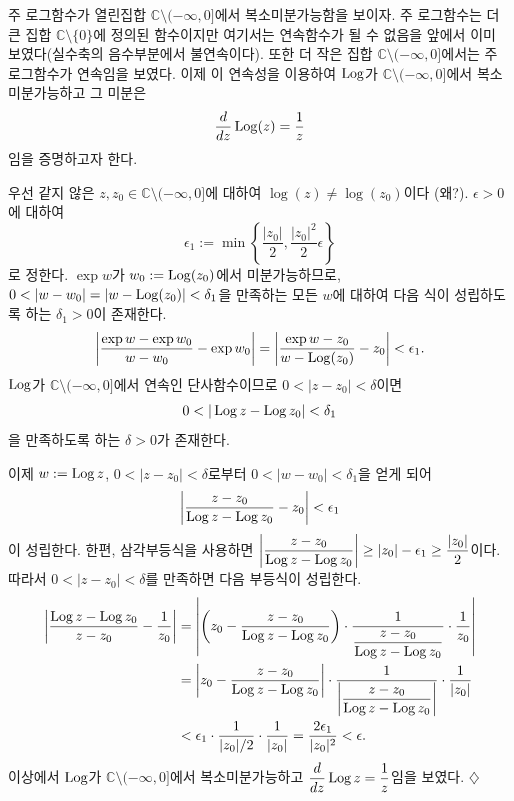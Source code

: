 \begin{salt_example} \label{example-2-9}
주 로그함수가 열린집합 $\mathbb C \setminus(-\infty,0]$에서
복소미분가능함을 보이자.
주 로그함수는 더 큰 집합 $\mathbb C \setminus\{0\}$에 정의된 함수이지만
여기서는 연속함수가 될 수 없음을 앞에서 이미 보였다(실수축의 음수부분에서 불연속이다).
또한 더 작은 집합 $\mathbb C \setminus(-\infty,0]$에서는 주 로그함수가 연속임을 보였다.
이제 이 연속성을 이용하여 $\mathop{\mathrm{Log}}$가 $\mathbb C \setminus(-\infty,0]$에서
복소미분가능하고 그 미분은
\[
\displaystyle\frac{d}{dz} \mathop{\mathrm{Log}} (z) = \displaystyle\frac 1z 
\]
임을 증명하고자 한다.

우선 같지 않은 $z, z_0 \in \mathbb C \setminus(-\infty,0]$에 대하여
$\log (z) \ne \log(z_0)$이다 (왜?).
$\epsilon>0$에 대하여
\[
\epsilon_1 := \min \left\{ \dfrac{|z_0|}2, \dfrac{|z_0|^2}2\epsilon \right\}
\]
로 정한다.
$\exp w$가 $w_0:=\mathop{\mathrm{Log}}(z_0)$에서 미분가능하므로,
$0<|w-w_0| = |w - \Log(z_0)| < \delta_1$을 만족하는 모든 $w$에 대하여
다음 식이 성립하도록 하는 $\delta_1>0$이 존재한다.
\[
\left| \displaystyle\frac{\exp w - \exp w_0}{w-w_0} - \exp w_0 \right|
= \left| \displaystyle\frac{\exp w - z_0}{w - \mathop{\mathrm{Log}}(z_0)} - z_0 \right| <\epsilon_1.
\]
$\mathop{\mathrm{Log}}$가 $\mathbb C \setminus(-\infty,0]$에서
연속인 단사함수이므로
$0<|z-z_0|<\delta$이면 
\[
0 < |\mathop{\mathrm{Log}} z - \mathop{\mathrm{Log}} z_0 | < \delta_1
\]
을 만족하도록 하는 $\delta>0$가 존재한다.

이제 $w:=\mathop{\mathrm{Log}} z$, $0<|z-z_0|<\delta$로부터
$0<|w-w_0|<\delta_1$을 얻게 되어
\[
\left| \displaystyle\frac{z-z_0}{\mathop{\mathrm{Log}} z - \mathop{\mathrm{Log}} z_0} - z_0 \right| < \epsilon_1
\]
이 성립한다.
한편, 삼각부등식을 사용하면
$ \left| \displaystyle\frac{z-z_0}{\mathop{\mathrm{Log}} z - \mathop{\mathrm{Log}} z_0} \right| \ge |z_0| - \epsilon_1 
\ge \displaystyle\frac{|z_0|}2$이다.
따라서 
$0<|z-z_0|<\delta$를 만족하면 다음 부등식이 성립한다.
\begin{align*}
\left| \displaystyle\frac{\mathop{\mathrm{Log}} z - \mathop{\mathrm{Log}} z_0}{z-z_0} - \displaystyle\frac1{z_0} \right|
&= \left| \left(z_0 - \displaystyle\frac{z-z_0}{\mathop{\mathrm{Log}} z - \mathop{\mathrm{Log}} z_0} \right)\cdot
\displaystyle\frac1{\displaystyle\frac{z-z_0}{\mathop{\mathrm{Log}} z - \mathop{\mathrm{Log}} z_0}}\cdot \displaystyle\frac1{z_0} \right| \\
&= \left| z_0 - \displaystyle\frac{z-z_0}{\mathop{\mathrm{Log}} z - \mathop{\mathrm{Log}} z_0} \right| \cdot
\displaystyle\frac1{\left|\displaystyle\frac{z-z_0}{\mathop{\mathrm{Log}} z - \mathop{\mathrm{Log}} z_0}\right|} \cdot
\displaystyle\frac1{|z_0|} \\
&< \epsilon_1 \cdot \displaystyle\frac1{|z_0|/2}\cdot \displaystyle\frac1{|z_0|} 
= \displaystyle\frac{2\epsilon_1}{|z_0|^2} < \epsilon.
\end{align*}
이상에서 $\mathop{\mathrm{Log}}$가 $\mathbb C \setminus (-\infty,0]$에서 복소미분가능하고
$\displaystyle\frac{d}{dz}\mathop{\mathrm{Log}} z = \displaystyle\frac 1z$임을 보였다.
\hfill $\diamondsuit$
\end{salt_example}

